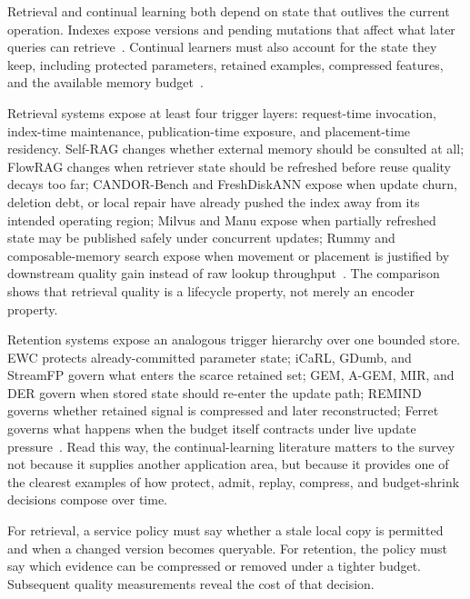 Retrieval and continual learning both depend on state that outlives the current operation. Indexes expose versions and pending mutations that affect what later queries can retrieve~\cite{singh2021freshdiskann,wang2021milvus,guo2022manu,asai2024selfrag,zhang2026flowrag,wang2026candor}. Continual learners must also account for the state they keep, including protected parameters, retained examples, compressed features, and the available memory budget~\cite{kirkpatrick2017ewc,rebuffi2017icarl,aljundi2019mir,prabhu2020gdumb,hayes2020remind,zhou2025ferret,li2026streamfp}.

Retrieval systems expose at least four trigger layers: request-time invocation, index-time maintenance, publication-time exposure, and placement-time residency. Self-RAG changes whether external memory should be consulted at all; FlowRAG changes when retriever state should be refreshed before reuse quality decays too far; CANDOR-Bench and FreshDiskANN expose when update churn, deletion debt, or local repair have already pushed the index away from its intended operating region; Milvus and Manu expose when partially refreshed state may be published safely under concurrent updates; Rummy and composable-memory search expose when movement or placement is justified by downstream quality gain instead of raw lookup throughput~\cite{asai2024selfrag,zhang2026flowrag,wang2026candor,singh2021freshdiskann,wang2021milvus,guo2022manu,zhang2024rummy,quinn2025accelerating}. The comparison shows that retrieval quality is a lifecycle property, not merely an encoder property.

Retention systems expose an analogous trigger hierarchy over one bounded store. EWC protects already-committed parameter state; iCaRL, GDumb, and StreamFP govern what enters the scarce retained set; GEM, A-GEM, MIR, and DER govern when stored state should re-enter the update path; REMIND governs whether retained signal is compressed and later reconstructed; Ferret governs what happens when the budget itself contracts under live update pressure~\cite{kirkpatrick2017ewc,rebuffi2017icarl,prabhu2020gdumb,li2026streamfp,lopez2017gem,chaudhry2019agem,aljundi2019mir,buzzega2020der,hayes2020remind,zhou2025ferret}. Read this way, the continual-learning literature matters to the survey not because it supplies another application area, but because it provides one of the clearest examples of how protect, admit, replay, compress, and budget-shrink decisions compose over time.

For retrieval, a service policy must say whether a stale local copy is permitted and when a changed version becomes queryable. For retention, the policy must say which evidence can be compressed or removed under a tighter budget. Subsequent quality measurements reveal the cost of that decision.

